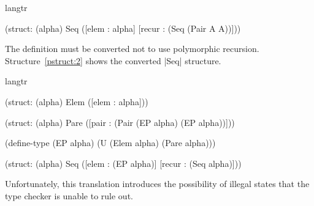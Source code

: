 \begin{pstructure}
  \begin{schemedisplay}
    langtr

    (struct: (alpha) Seq
      ([elem   : alpha]
       [recur : (Seq (Pair A A))]))
  \end{schemedisplay}
  \label{pstruct:1}
\end{pstructure}

The definition must be converted not to use polymorphic recursion.
Structure~\ref{pstruct:2} shows the converted \scheme|Seq| structure.

\begin{pstructure}
  \begin{schemedisplay}
    langtr

    (struct: (alpha) Elem ([elem : alpha]))
    
    (struct: (alpha) Pare 
      ([pair : (Pair (EP alpha) (EP alpha))]))
    
    (define-type (EP alpha) (U (Elem alpha) (Pare alpha)))
    
    (struct: (alpha) Seq
      ([elem   : (EP alpha)]
       [recur : (Seq alpha)]))
  \end{schemedisplay}
  \label{pstruct:2}
\end{pstructure}

Unfortunately, this translation introduces the possibility of illegal
states that the type checker is unable to rule out.

% 
% 
%  
% 
% 


